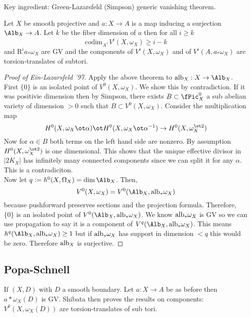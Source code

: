 \documentclass[12pt]{article}
\theoremstyle{plain}
\begin{document}
Key ingredient: Green-Lazarsfeld (Simpson) generic vanishing theorem.

\renewcommand{\codim}{\mathrm{codim}}
\newcommand{\R}{\mathrm{R}}

\begin{theorem}
Let $X$ be smooth projective and $a : X \to A$ is a map inducing a surjection $\Alb_X \to A$. Let $k$ be the fiber dimension of $a$ then for all $i \ge k$ 
\[ \codim_{A^\vee} V^i(X, \omega_X) \ge i - k \]
and $\R^i a_* \omega_X$ are GV and the components of $V^i(X, \omega_X)$ and of $V^i(A, a_* \omega_X)$ are torsion-translates of subtori. 
\end{theorem}


\begin{proof}[Proof of Ein-Lazarsfeld '97]
Apply the above theorem to $\alb_X : X \to \Alb_X$.
First $\{ 0 \}$ is an isolated point of $V^0(X, \omega_X)$. We show this by contradiction. If it was positivie dimension then by Simpson, there exists $B \subset \fPic^0_X$ a sub abelian variety of dimension $> 0$ such that $B \subset V^0(X, \omega_X)$. Consider the multiplication map
\[ H^0(X, \omega_X \ot \alpha) \ot H^0(X, \omega_X \ot \alpha^{-1}) \to H^0(X, \omega_X^{\ot 2}) \]  
Now for $\alpha \in B$ both terms on the left hand side are nonzero. By assumption $H^0(X, \omega_X^{\ot 2})$ is one dimensional. This shows that the unique effective divisor in $|2 K_X|$ has infinitely many connected components since we can split it for any $\alpha$. This is a contradiciton. 
\bigskip\\
Now let $q := h^0(X, \Omega_X) = \dim{\Alb_X}$. Then,
\[ V^0(X, \omega_X) = V^0(\Alb_X, \alb_* \omega_X) \]
because pushforward preserves sections and the projection formula. Therefore, $\{ 0 \}$ is an isolated point of $V^0(\Alb_X, \alb_* \omega_X)$. We know $\mathrm{alb}_* \omega_X$ is GV so we can use propagation to say it is a component of $V^q(\Alb_X, \alb_* \omega_X)$. This means $h^q(\Alb_X, \alb_* \omega_X) \ge 1$ but if $\mathrm{alb}_* \omega_X$ has support in dimension $< q$ this would be zero. Therefore $\mathrm{alb}_X$ is surjective.
\end{proof}

\subsection{Popa-Schnell}

If $(X,D)$ with $D$ a smooth boundary. Let $a : X \to A$ be as before then $a* \omega_X(D)$ is GV. Shibata then proves the results on components: $V^k(X, \omega_X(D))$ are torsion-translates of sub tori. 
\end{document}
